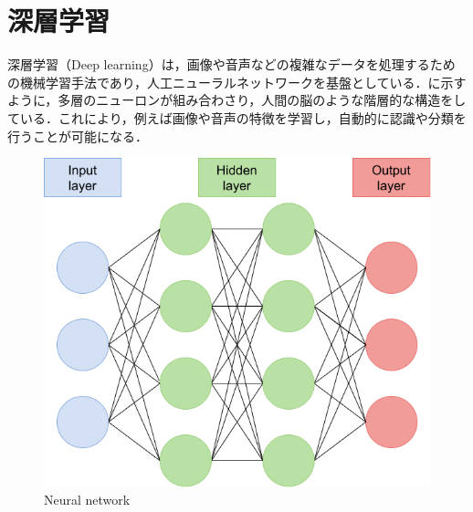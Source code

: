 
\section{深層学習}

深層学習（Deep learning）は，画像や音声などの複雑なデータを処理するための機械学習手法であり，人工ニューラルネットワークを基盤としている．に示すように，多層のニューロンが組み合わさり，人間の脳のような階層的な構造をしている．これにより，例えば画像や音声の特徴を学習し，自動的に認識や分類を行うことが可能になる．

\begin{figure}[h]
  \centering
  \includegraphics[keepaspectratio, scale=0.30] {images/deep_neural_network.png}
  \caption{Neural network}
  \label{Fig:deep_neural_network}
\end{figure}

\newpage

